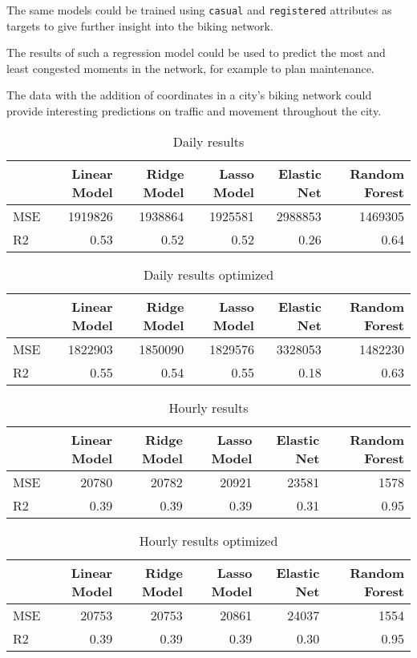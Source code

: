 \documentclass[11pt]{article}
\begin{document}
The same models could be trained using \texttt{casual} and \texttt{registered} attributes as targets to give further insight into the biking network.

The results of such a regression model could be used to predict the most and least congested moments in the network, for example to plan maintenance.

The data with the addition of coordinates in a city's biking network could provide interesting predictions on traffic and movement throughout the city.

\pagebreak
\fillbreak
\begin{table}[htbp]
\caption{Daily results}
\centering
\begin{tabular}{lrrrrr}
 & Linear Model & Ridge Model & Lasso Model & Elastic Net & Random Forest\\[0pt]
\hline
MSE & 1919826 & 1938864 & 1925581 & 2988853 & 1469305\\[0pt]
R2 & 0.53 & 0.52 & 0.52 & 0.26 & 0.64\\[0pt]
\end{tabular}
\end{table}

\begin{table}[htbp]
\caption{Daily results optimized}
\centering
\begin{tabular}{lrrrrr}
 & Linear Model & Ridge Model & Lasso Model & Elastic Net & Random Forest\\[0pt]
\hline
MSE & 1822903 & 1850090 & 1829576 & 3328053 & 1482230\\[0pt]
R2 & 0.55 & 0.54 & 0.55 & 0.18 & 0.63\\[0pt]
\end{tabular}
\end{table}

\pagebreak
\begin{table}[htbp]
\caption{Hourly results}
\centering
\begin{tabular}{lrrrrr}
 & Linear Model & Ridge Model & Lasso Model & Elastic Net & Random Forest\\[0pt]
\hline
MSE & 20780 & 20782 & 20921 & 23581 & 1578\\[0pt]
R2 & 0.39 & 0.39 & 0.39 & 0.31 & 0.95\\[0pt]
\end{tabular}
\end{table}

\begin{table}[htbp]
\caption{Hourly results optimized}
\centering
\begin{tabular}{lrrrrr}
 & Linear Model & Ridge Model & Lasso Model & Elastic Net & Random Forest\\[0pt]
\hline
MSE & 20753 & 20753 & 20861 & 24037 & 1554\\[0pt]
R2 & 0.39 & 0.39 & 0.39 & 0.30 & 0.95\\[0pt]
\end{tabular}
\end{table}

\fillbreak
\end{document}

